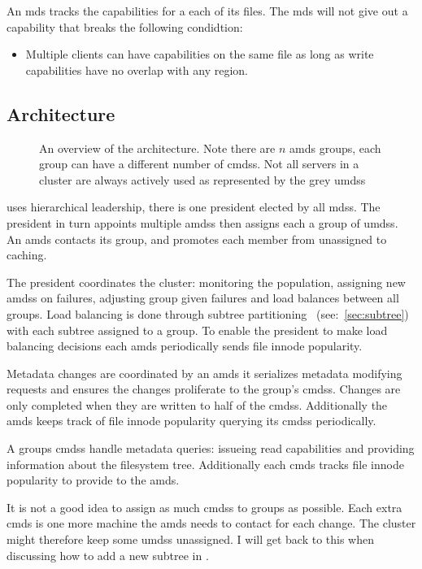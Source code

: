 \begin{samepage}
An \ac{mds} tracks the capabilities for a each of its files. The \ac{mds} will not give out a capability that breaks the following condidtion:
%
\begin{itemize}
	\item Multiple clients can have capabilities on the same file as long as write capabilities have no overlap with any region.
\end{itemize}
\end{samepage}
% 
\subsection{Architecture}
\begin{figure}
	
	\caption{An overview of the architecture. Note there are $n$ \acf{amds} groups, each group can have a different number of \acfp{cmds}. Not all servers in a cluster are always actively used as represented by the grey \acfp{umds}}
\end{figure}

\Name{} uses hierarchical leadership, there is one president elected by all \acp{mds}. The president in turn appoints multiple \acfp{amds} then assigns each a group of \acfp{umds}. An \ac{amds} contacts its group, and promotes each member from unassigned to caching. 

The president coordinates the cluster: monitoring the population, assigning new \acp{amds} on failures, adjusting group given failures and load balances between all groups. Load balancing is done through subtree partitioning~\cite{ceph} (see:~\cref{sec:subtree}) with each subtree assigned to a group. To enable the president to make load balancing decisions each \ac{amds} periodically sends file innode popularity.

Metadata changes are coordinated by an \ac{amds} it serializes metadata modifying requests and ensures the changes proliferate to the group's \acp{cmds}. Changes are only completed when they are written to half of the \acp{cmds}. Additionally the \ac{amds} keeps track of file innode popularity querying its \acp{cmds} periodically.

A groups \acp{cmds} handle metadata queries: issueing read capabilities and providing information about the filesystem tree. Additionally each \ac{cmds} tracks file innode popularity to provide to the \ac{amds}. 

It is not a good idea to assign as much \acp{cmds} to groups as possible. Each extra \ac{cmds} is one more machine the \ac{amds} needs to contact for each change. The cluster might therefore keep some \acp{umds} unassigned. I will get back to this when discussing how to add a new subtree in .
%
